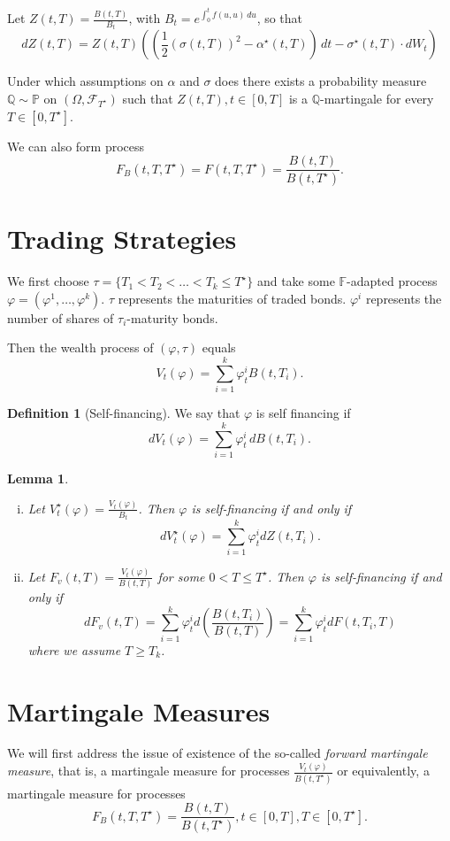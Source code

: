 \documentclass[10pt, oneside, reqno]{amsbook}
\theoremstyle{plain}%
\newtheorem{lem}[thm]{Lemma}
\theoremstyle{definition}
\newtheorem{defn}[thm]{Definition}
\theoremstyle{remark}
\renewcommand{\phi}{\varphi}
\newcommand{\sigf}{\mathcal{F}}
\newcommand{\Q}{\mathbb{Q}}
\renewcommand{\P}{\mathbb{P}}
\newcommand{\F}{\mathbb{F}}
\numberwithin{equation}{chapter}
\begin{document}
Let $Z(t, T) = \frac{B(t, T)}{B_t}$, with $B_t = e^{\int_0^t f(u, u) \, du}$, so that \[
    dZ(t, T) = Z(t, T) \left( \left(\frac{1}{2} \left( \sigma(t, T) \right)^2 - \alpha^\star(t, T) \right) \, dt - \sigma^\star(t, T) \cdot dW_t \right) 
\]  

Under which assumptions on $\alpha$ and $\sigma$ does there exists a probability measure $\Q \sim \P$ on $(\Omega, \sigf_{T^\star})$ such that $Z(t, T), t \in [0, T]$ is a $\Q$-martingale for every $T \in [0, T^\star]$.

We can also form process \[
    F_B(t, T, T^\star) = F(t, T, T^\star) = \frac{B(t, T)}{B(t, T^\star)}.
\]

\section{Trading Strategies} %
\label{sec:trading_strategies}
We first choose $\tau = \{ T_1 < T_2 < \dots < T_k \leq T^\star \}$ and take some $\F$-adapted process $\phi = (\phi^1, \dots, \phi^k)$.  $\tau$ represents the maturities of traded bonds.  $\phi^i$ represents the number of shares of $\tau_i$-maturity bonds.  

Then the wealth process of $(\phi, \tau)$ equals \[
    V_t(\phi) = \sum_{i=1}^k \phi^i_t B(t, T_i).
\] 

\begin{defn}[Self-financing]
    We say that $\phi$ is self financing if \[
        dV_t(\phi) = \sum_{i=1}^k \phi_t^i \, dB(t, T_i).
    \]
\end{defn}

\begin{lem}{\ }
    \begin{enumerate}[(i)]
        \item 
    Let $V_t^\star(\phi) = \frac{V_t(\phi)}{B_t}$.  Then $\phi$ is self-financing if and only if \[
        dV^\star_t(\phi) = \sum_{i=1}^k \phi_t^i d Z(t, T_i).
    \] 
        \item 
        Let $F_v(t, T) = \frac{V_t(\phi)}{B(t, T)}$ for some $0 < T \leq T^\star$. Then $\phi$ is self-financing if and only if \[
            dF_v(t, T) = \sum_{i=1}^k \phi^i_t d \left( \frac{B(t, T_i)}{B(t, T)} \right) = \sum_{i=1}^k  \phi^i_t dF(t, T_i, T)
        \] where we assume $T \geq T_k$.
    \end{enumerate}

\end{lem}

\section{Martingale Measures} %
\label{sec:martingale_measures}
We will first address the issue of existence of the so-called \emph{forward martingale measure}, that is, a martingale measure for processes $\frac{V_t(\phi)}{B(t, T^\star)}$ or equivalently, a martingale measure for processes \[
    F_B(t, T, T^\star) = \frac{B(t, T)}{B(t, T^\star)}, t \in [0,T], T \in [0, T^\star].
\]  
\end{document}

